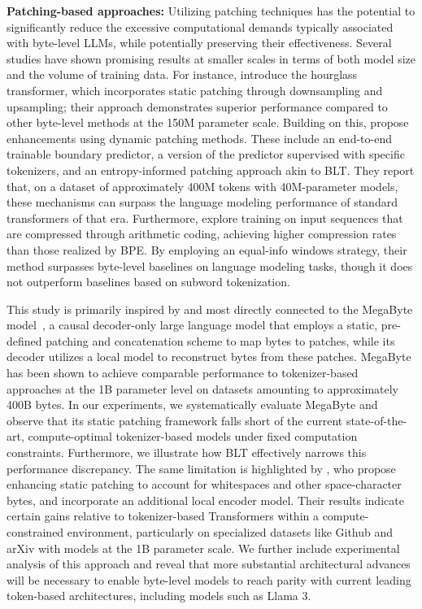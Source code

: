 \textbf{Patching-based approaches:} Utilizing patching techniques has the potential to significantly reduce the excessive computational demands typically associated with byte-level LLMs, while potentially preserving their effectiveness. Several studies have shown promising results at smaller scales in terms of both model size and the volume of training data. For instance, \cite{nawrot-etal-2022-hierarchical} introduce the hourglass transformer, which incorporates static patching through downsampling and upsampling; their approach demonstrates superior performance compared to other byte-level methods at the 150M parameter scale. Building on this, \cite{nawrot-etal-2023-efficient} propose enhancements using dynamic patching methods. These include an end-to-end trainable boundary predictor, a version of the predictor supervised with specific tokenizers, and an entropy-informed patching approach akin to {\textsc BLT}. They report that, on a dataset of approximately 400M tokens with 40M-parameter models, these mechanisms can surpass the language modeling performance of standard transformers of that era. Furthermore, \cite{lester2024training} explore training on input sequences that are compressed through arithmetic coding, achieving higher compression rates than those realized by BPE. By employing an equal-info windows strategy, their method surpasses byte-level baselines on language modeling tasks, though it does not outperform baselines based on subword tokenization.

This study is primarily inspired by and most directly connected to the MegaByte model~\citep{yu2023megabyte}, a causal decoder-only large language model that employs a static, pre-defined patching and concatenation scheme to map bytes to patches, while its decoder utilizes a local model to reconstruct bytes from these patches. MegaByte has been shown to achieve comparable performance to tokenizer-based approaches at the 1B parameter level on datasets amounting to approximately 400B bytes. In our experiments, we systematically evaluate MegaByte and observe that its static patching framework falls short of the current state-of-the-art, compute-optimal tokenizer-based models under fixed computation constraints. Furthermore, we illustrate how {\textsc BLT} effectively narrows this performance discrepancy. The same limitation is highlighted by \cite{slagle2024spacebyte}, who propose enhancing static patching to account for whitespaces and other space-character bytes, and incorporate an additional local encoder model. Their results indicate certain gains relative to tokenizer-based Transformers within a compute-constrained environment, particularly on specialized datasets like Github and arXiv with models at the 1B parameter scale. We further include experimental analysis of this approach and reveal that more substantial architectural advances will be necessary to enable byte-level models to reach parity with current leading token-based architectures, including models such as Llama 3.

